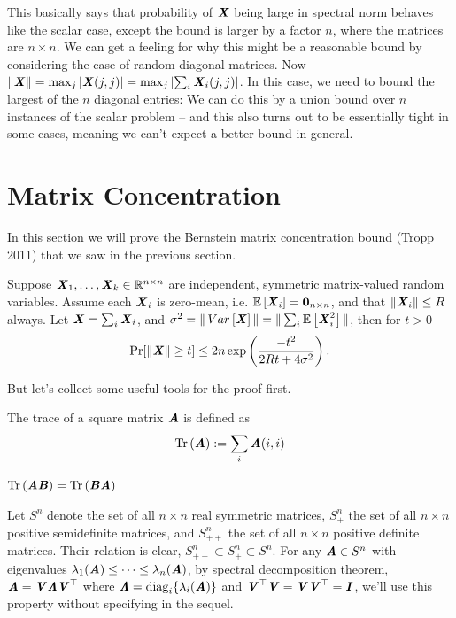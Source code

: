 This basically says that probability of $\XX$ being large in spectral
norm behaves like the scalar case, except the bound is larger by a factor
$n$, where the matrices are $n \times n$.
We can get a feeling for why this might be a reasonable bound by
considering the case of random diagonal matrices.
Now $\norm{\XX} = \max_j \abs{\XX (j,j)} = \max_j \abs{\sum_i
  \XX_i(j,j)}$.
In this case, we need to bound the largest of the $n$ diagonal
entries: We can do this by a union bound over $n$ instances of the
scalar problem -- and this also turns out to be essentially tight in some cases,
meaning we can't expect a better bound in general.

\section{Matrix Concentration}
In this section we will prove the Bernstein matrix concentration bound
(Tropp 2011) that we saw in the previous section.
\begin{theorem}\label{thm:matbernstein}
  Suppose $\XX_1, \ldots, \XX_k \in \R^{n \times n}$ are independent, symmetric matrix-valued random variables.
  Assume each $\XX_i$ is zero-mean, i.e. $\E{\XX_i} = \matzero_{n \times
  n}$, and that $\norm{\XX_i} \leq R$ always.
  Let $\XX = \sum_i \XX_i$, and $\sigma^2 = \|\Var{\XX}\| = \|\sum_i \E{\XX_i^2}\|$, then for $t > 0$
  \[
  \Pr[ \norm{\XX} \geq t] \leq 2n\exp\left(\frac{-t^2}{2Rt + 4\sigma^2}\right).
  \]
\end{theorem}
But let's collect some useful tools for the proof first.

\begin{definition}[trace]
  The trace of a square matrix $\AA$ is defined as
  \[ \trace{\AA} := \sum_{i} \AA(i,i) \]
\end{definition}

\begin{claim}
  $\trace{\AA\BB} = \trace{\BB\AA}$
\end{claim}

Let $S^n$ denote the set of all $n\times n$ real symmetric matrices,
$S^n_+$ the set of all $n\times n$ positive semidefinite matrices,
and $S^n_{++}$ the set of all $n\times n$ positive definite matrices.
Their relation is clear, $S^n_{++} \subset S^n_+ \subset S^n$.
For any $\AA\in S^n$ with eigenvalues $\lambda_1(\AA)\leq\cdots\leq\lambda_n(\AA)$, by spectral decomposition theorem, $\AA = \VV\LLambda\VV^\trp$ where $\LLambda=\diag_i\{\lambda_i(\AA)\}$ and $\VV^\trp\VV=\VV\VV^\trp=\II$,
we'll use this property without specifying in the sequel.

